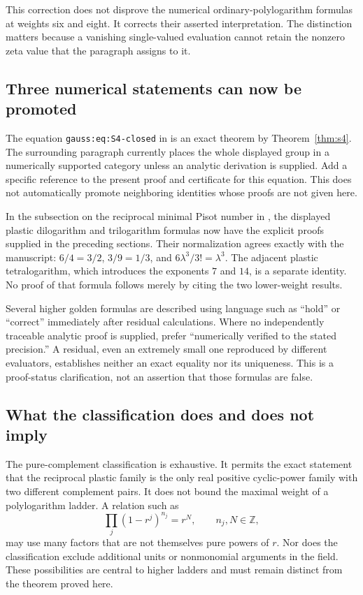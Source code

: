 This correction does not disprove the numerical ordinary-polylogarithm
formulas at weights six and eight. It corrects their asserted
interpretation. The distinction matters because a vanishing
single-valued evaluation cannot retain the nonzero zeta value that the
paragraph assigns to it.

\subsection{Three numerical statements can now be promoted}

The equation \texttt{gauss:eq:S4-closed} in
 is an exact theorem by
Theorem~\ref{thm:s4}. The surrounding paragraph currently places the
whole displayed group in a numerically supported category unless an
analytic derivation is supplied. Add a specific reference to the present
proof and certificate for this equation. This does not automatically
promote neighboring identities whose proofs are not given here.

In the subsection on the reciprocal minimal Pisot number in
, the displayed plastic dilogarithm and
trilogarithm formulas now have the explicit proofs supplied in the
preceding sections. Their normalization agrees exactly with the
manuscript: $6/4=3/2$, $3/9=1/3$, and $6\lambda^3/3!=\lambda^3$.
The adjacent plastic tetralogarithm, which introduces the exponents
$7$ and $14$, is a separate identity. No proof of that formula follows
merely by citing the two lower-weight results.

Several higher golden formulas are described using language such as
``hold'' or ``correct'' immediately after residual calculations.
Where no independently traceable analytic proof is supplied, prefer
``numerically verified to the stated precision.'' A residual, even an
extremely small one reproduced by different evaluators, establishes
neither an exact equality nor its uniqueness. This is a proof-status
clarification, not an assertion that those formulas are false.

\subsection{What the classification does and does not imply}

The pure-complement classification is exhaustive. It permits the exact
statement that the reciprocal plastic family is the only real positive
cyclic-power family with two different complement pairs. It does not
bound the maximal weight of a polylogarithm ladder. A relation such as
\[
 \prod_j(1-r^j)^{n_j}=r^N,
 \qquad n_j,N\in\mathbb Z,
\]
may use many factors that are not themselves pure powers of $r$.
Nor does the classification exclude additional units or nonmonomial
arguments in the field. These possibilities are central to higher
ladders and must remain distinct from the theorem proved here.

